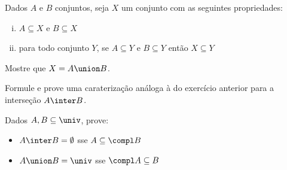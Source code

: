 \begin{exercise}
Dados $A$ e $B$ conjuntos, seja $X$ um conjunto com as seguintes propriedades:
\begin{enumerate}[(i)]
  \item $A \subseteq X$ e $B \subseteq X$
  \item para todo conjunto $Y$, se $A \subseteq Y$ e $B \subseteq Y$ então $X \subseteq Y$
\end{enumerate}
Mostre que $X = A \union B$.
\end{exercise}

\begin{exercise}
Formule e prove uma caraterização análoga à do exercício anterior para a interseção $A \inter B$.
\end{exercise}

\begin{exercise}
Dados $A,B \subseteq \univ$, prove:
\begin{itemize}
  \item $A \inter B = \emptyset$ sse $A \subseteq \compl B$
  \item $A \union B = \univ$ sse $\compl A \subseteq B$ 
\end{itemize}
\end{exercise}
